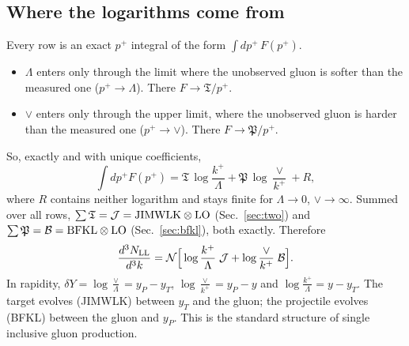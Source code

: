 \documentclass[10pt]{article}
\numberwithin{equation}{section}
\begin{document}
\subsection{Where the logarithms come from}
Every row is an exact $p^+$ integral of the form $\int dp^+\,F(p^+)$.
\begin{itemize}
\item $\Lambda$ enters only through the limit where the unobserved gluon is softer than the measured one ($p^+\to\Lambda$). There $F\to\mathfrak T/p^+$.
\item $\vee$ enters only through the upper limit, where the unobserved gluon is harder than the measured one ($p^+\to\vee$). There $F\to\mathfrak P/p^+$.
\end{itemize}
So, exactly and with unique coefficients,
\begin{equation}
\int dp^+F(p^+)=\mathfrak T\,\log\frac{k^+}{\Lambda}+\mathfrak P\,\log\frac{\vee}{k^+}+R ,
\label{eq:TP}
\end{equation}
where $R$ contains neither logarithm and stays finite for $\Lambda\to0$, $\vee\to\infty$. Summed over all rows, $\sum\mathfrak T=\mathcal J={\rm JIMWLK}\otimes{\rm LO}$ (Sec.~\ref{sec:two}) and $\sum\mathfrak P=\mathcal B={\rm BFKL}\otimes{\rm LO}$ (Sec.~\ref{sec:bfkl}), both exactly. Therefore
\begin{equation}
\frac{d^3N_{\rm LL}}{d^3k}=\mathcal N\Big[\log\frac{k^+}{\Lambda}\;\mathcal J+\log\frac{\vee}{k^+}\;\mathcal B\Big] .
\label{eq:LLexact}
\end{equation}
In rapidity, $\delta Y=\log\frac{\vee}{\Lambda}=y_P-y_T$, $\log\frac{\vee}{k^+}=y_P-y$ and $\log\frac{k^+}{\Lambda}=y-y_T$. The target evolves (JIMWLK) between $y_T$ and the gluon; the projectile evolves (BFKL) between the gluon and $y_P$. This is the standard structure of single inclusive gluon production.
\end{document}
